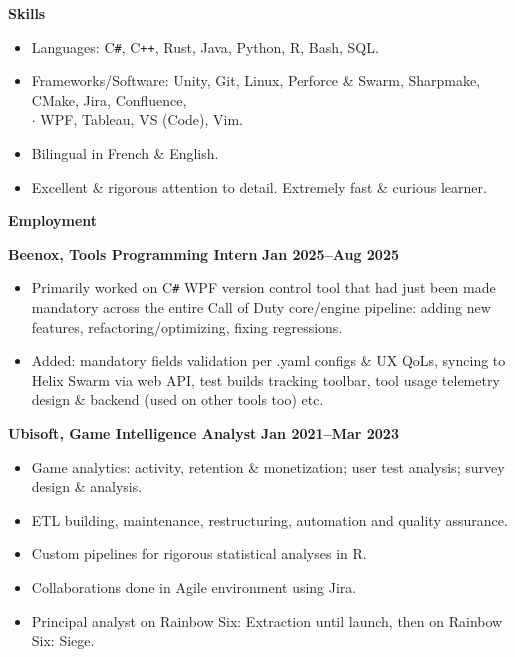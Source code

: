\documentclass[11pt, oneside]{article}   	%
\begin{document}
\textbf{\large{Skills}}
\small \vspace{-4pt}
\begin{itemize}
\item Languages: C\texttt{\#}, C\texttt{++}, Rust, Java, Python, R, Bash, SQL.
\vspace{-4pt}
\item Frameworks/Software: Unity, Git, Linux, Perforce \& Swarm, Sharpmake, CMake, Jira, Confluence, \\ \textcolor{charcoal}{$\cdot$} \hspace{92pt} WPF, Tableau, VS (Code), Vim.
\vspace{-4pt}
\item Bilingual in French \& English.
\vspace{-4pt}
\item Excellent \& rigorous attention to detail. Extremely fast \& curious learner.
\end{itemize}

\vspace{12pt}

\textbf{\large{Employment}}
\small 

\vspace{6pt}

\textbf{Beenox, Tools Programming Intern} \hfill \textbf{Jan 2025--Aug 2025}
\begin{itemize}
\item Primarily worked on C\texttt{\#} WPF version control tool that had just been made mandatory across the entire Call of Duty core/engine pipeline: adding new features, refactoring/optimizing, fixing regressions.
\vspace{-4pt}
\item Added: mandatory fields validation per .yaml configs \& UX QoLs, syncing to Helix Swarm via web API, test builds tracking toolbar, tool usage telemetry design \& backend (used on other tools too) etc.
\end{itemize}

\vspace{4pt}

\textbf{Ubisoft, Game Intelligence Analyst} \hfill \textbf{Jan 2021--Mar 2023}
\vspace{-4pt}
\begin{itemize}
\item Game analytics: activity, retention \& monetization; user test analysis; survey design \& analysis.
\vspace{-4pt}
\item ETL building, maintenance, restructuring, automation and quality assurance.
\vspace{-4pt}
\item Custom pipelines for rigorous statistical analyses in R.
\vspace{-4pt}
\item Collaborations done in Agile environment using Jira.
\vspace{-4pt}
\item Principal analyst on Rainbow Six: Extraction until launch, then on Rainbow Six: Siege.
\end{itemize}
\end{document}
